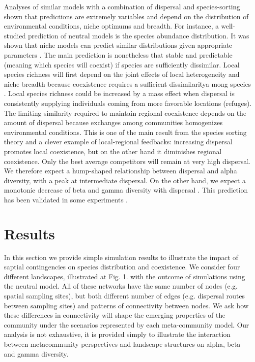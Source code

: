 \documentclass[12pt]{article}
\begin{document}
Analyses of similar models with a combination of dispersal and species-sorting
shown that predictions are extremely variables and depend on the distribution of
environmental conditions, niche optimums and breadth. For instance, a
well-studied prediction of neutral models is the species abundance distribution.
It was shown that niche models can predict similar distributions given appropriate parameters
\parencite{Tilman2004,Gravel2006}. The main prediction is nonetheless that
stable and predictable (meaning which species will coexist) if species are
sufficiently dissimilar. Local species richness will first depend on the joint
effects of local heterogeneity and niche breadth because coexistence requires a
sufficient dissimilaritya mong species \parencite{Schwilk2005}. Local species richness could be
increased by a mass effect when dispersal is consistently supplying individuals
coming from more favorable locations (refuges). The limiting similarity required
to maintain regional coexistence depends on the amount of dispersal because
exchanges among communities homogenizes environmental conditions. This is one of
the main result from the species sorting theory and a clever example of
local-regional feedbacks: increasing dispersal promotes local coexistence, but
on the other hand it diminishes regional coexistence. Only the best average
competitors will remain at very high dispersal.  We therefore expect a
hump-shaped relationship between dispersal and alpha diversity, with a peak at
intermediate dispersal. On the other hand, we expect a monotonic decrease of
beta and gamma diversity with dispersal \parencite{Mouquet2003}. This prediction
has been validated in some experiments \parencite{Venail2008, Logue2011}.

\section{Results}

In this section we provide simple simulation results to illustrate the impact of saptial contingencies on species distribution and coexistence. We consider four different landscapes, illustrated at Fig. 1.
with the outcome of simulations using the neutral model. All of these
networks have the same number of nodes (e.g. spatial sampling sites), but both
different number of edges (e.g. dispersal routes between sampling sites) and
patterns of connectivity between nodes. We ask how these differences in
connectivity will shape the emerging properties of the community under the
scenarios represented by each meta-community model. Our analysis is not exhaustive, it is provided simply to illustrate the interaction between metacommunity perspectives and landscape structures on alpha, beta and gamma diversity. 
\end{document}
